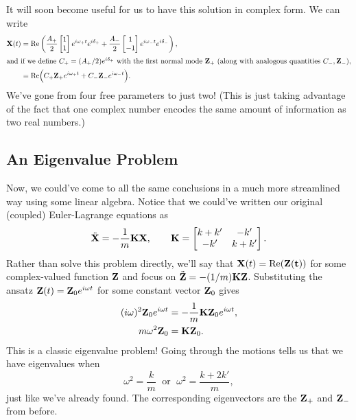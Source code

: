 \documentclass[../p111main.tex]{subfiles}
\begin{document}
It will soon become useful for us to have this solution in complex form.
We can write
\begin{align*}
    \mathbf{X}(t) &= \textrm{Re} \left( \frac{A_+}{2} \begin{bmatrix} 1 \\ 1 \end{bmatrix} e^{i \omega_+ t} e^{i \delta_+} + \frac{A_-}{2} \begin{bmatrix} 1 \\ -1 \end{bmatrix} e^{i \omega_- t} e^{i \delta_-} \right), \\
    \intertext{and if we define $C_+ = (A_+ / 2) e^{i\delta_+}$ with the first normal mode $\mathbf{Z}_+$ (along with analogous quantities $C_-, \mathbf{Z}_-$),}
    &= \textrm{Re} \Big( C_+ \mathbf{Z}_+ e^{i\omega_+ t} + C_- \mathbf{Z}_- e^{i\omega_- t} \Big).
\end{align*}
We've gone from four free parameters to just two!
(This is just taking advantage of the fact that one complex number encodes the same amount of information as two real numbers.)

\subsection*{An Eigenvalue Problem}
Now, we could've come to all the same conclusions in a much more streamlined way using some linear algebra.
Notice that we could've written our original (coupled) Euler-Lagrange equations as
\[ \ddot{\mathbf{X}} = -\frac{1}{m} \mathbf{K} \mathbf{X}, \qquad \mathbf{K} = \begin{bmatrix} k + k' & -k' \\ -k' & k + k' \end{bmatrix}. \]
Rather than solve this problem directly, we'll say that $\mathbf{X}(t) = \textrm{Re}(\mathbf{Z(t)})$ for some complex-valued function $\mathbf{Z}$ and focus on $\ddot{\mathbf{Z}} = -(1 / m) \mathbf{K} \mathbf{Z}$.
Substituting the ansatz $\mathbf{Z}(t) = \mathbf{Z}_0 e^{i \omega t}$ for some constant vector $\mathbf{Z}_0$ gives
\begin{align*}
    (i\omega)^2 \mathbf{Z}_0 e^{i\omega t} &= -\frac{1}{m} \mathbf{K} \mathbf{Z}_0 e^{i\omega t}, \\
    m \omega^2 \mathbf{Z}_0 &= \mathbf{K} \mathbf{Z}_0.
\end{align*}
This is a classic eigenvalue problem!
Going through the motions tells us that we have eigenvalues when
\[ \omega^2 = \frac{k}{m} \;\text{ or }\; \omega^2 = \frac{k + 2k'}{m}, \]
just like we've already found.
The corresponding eigenvectors are the $\mathbf{Z}_+$ and $\mathbf{Z}_-$ from before.
\end{document}
